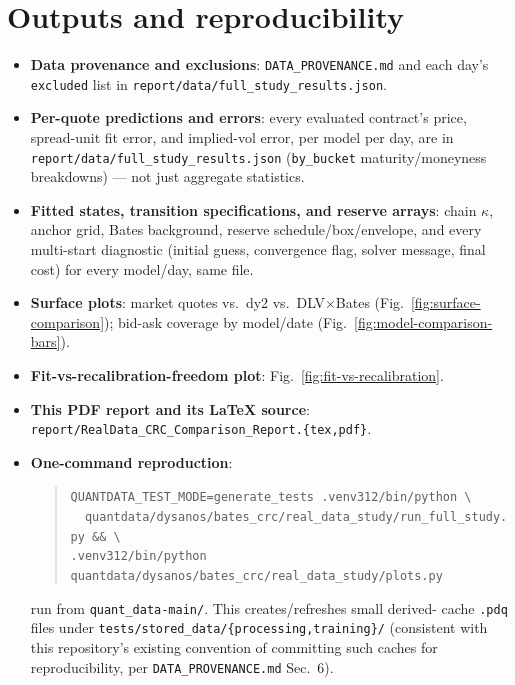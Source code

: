 \section{Outputs and reproducibility}
\label{sec:outputs}

\begin{itemize}
\item \textbf{Data provenance and exclusions}: \texttt{DATA\_PROVENANCE.md}
  and each day's \texttt{excluded} list in
  \texttt{report/data/full\_study\_results.json}.
\item \textbf{Per-quote predictions and errors}: every evaluated
  contract's price, spread-unit fit error, and implied-vol error, per
  model per day, are in \texttt{report/data/full\_study\_results.json}
  (\texttt{by\_bucket} maturity/moneyness breakdowns) --- not just
  aggregate statistics.
\item \textbf{Fitted states, transition specifications, and reserve
  arrays}: chain $\kappa$, anchor grid, Bates background, reserve
  schedule/box/envelope, and every multi-start diagnostic (initial guess,
  convergence flag, solver message, final cost) for every model/day, same
  file.
\item \textbf{Surface plots}: market quotes vs.\ dy2 vs.\ DLV$\times$Bates
  (Fig.~\ref{fig:surface-comparison}); bid-ask coverage by model/date
  (Fig.~\ref{fig:model-comparison-bars}).
\item \textbf{Fit-vs-recalibration-freedom plot}:
  Fig.~\ref{fig:fit-vs-recalibration}.
\item \textbf{This PDF report and its \LaTeX{} source}:
  \texttt{report/RealData\_CRC\_Comparison\_Report.\{tex,pdf\}}.
\item \textbf{One-command reproduction}:
\begin{quote}
\texttt{QUANTDATA\_TEST\_MODE=generate\_tests .venv312/bin/python \textbackslash \\
\ \ quantdata/dysanos/bates\_crc/real\_data\_study/run\_full\_study.py \&\& \textbackslash \\
.venv312/bin/python quantdata/dysanos/bates\_crc/real\_data\_study/plots.py}
\end{quote}
run from \texttt{quant\_data-main/}. This creates/refreshes small derived-
cache \texttt{.pdq} files under \texttt{tests/stored\_data/\{processing,training\}/}
(consistent with this repository's existing convention of committing such
caches for reproducibility, per \texttt{DATA\_PROVENANCE.md} Sec.~6).
\end{itemize}


